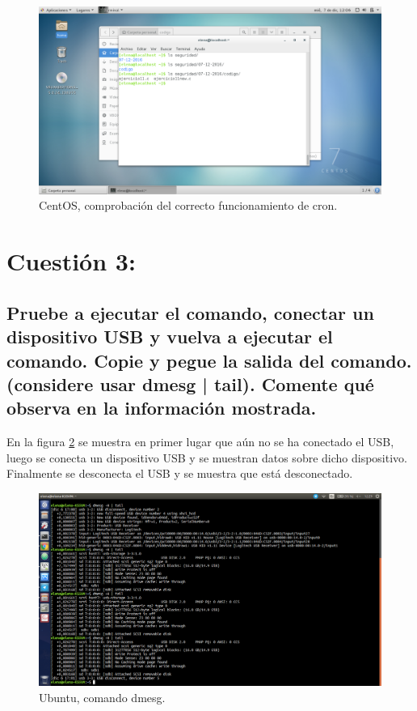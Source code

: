 \begin{figure}[H] 
	\centering
	\includegraphics[width=14.7cm]{./img/ejercicio2_2.png} 	
	\caption{CentOS, comprobación del correcto funcionamiento de cron.} \label{fig:ejercicio2_2}
\end{figure}




\section{Cuestión 3:}

\subsection{Pruebe a ejecutar el comando, conectar un dispositivo USB y vuelva a ejecutar el comando. Copie y pegue la salida del comando. (considere usar dmesg | tail). Comente qué observa en la información mostrada.}

En la figura \ref{fig:ejercicio3} se muestra en primer lugar que aún no se ha conectado el USB, luego se conecta un dispositivo USB y se muestran datos sobre dicho dispositivo. Finalmente se desconecta el USB y se muestra que está desconectado.

\begin{figure}[H] 
	\centering
	\includegraphics[width=14.7cm]{./img/ejercicio3.png} 	
	\caption{Ubuntu, comando dmesg.} \label{fig:ejercicio3}
\end{figure}


